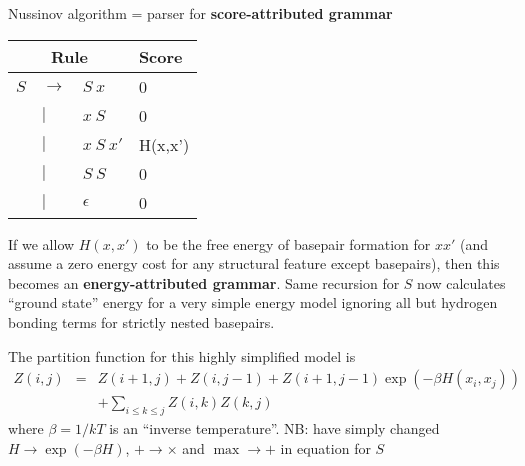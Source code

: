 \documentclass{beamer}
\begin{document}
\begin{frame}{}
Nussinov algorithm = parser for {\bf score-attributed grammar}

\begin{tabular}{rll|l}
\multicolumn{3}{c|}{Rule} & Score \\
\hline
$S$ & $\to$ & $S\ x$     & 0 \\
    &   $|$ & $x\ S$     & 0 \\
    &   $|$ & $x\ S\ x'$ & H(x,x') \\
    &   $|$ & $S\ S$     & 0 \\
    &   $|$ & $\epsilon$ & 0
\end{tabular}

If we allow $H(x,x')$ to be the free energy of basepair formation for $xx'$
(and assume a zero energy cost for any structural feature except basepairs),
then this becomes an {\bf energy-attributed grammar}.
Same recursion for $S$ now calculates ``ground state'' energy
for a very simple energy model ignoring all but hydrogen bonding terms for strictly nested basepairs.
\end{frame}

\begin{frame}{}
The partition function for this highly simplified model is
\begin{eqnarray*}
Z(i,j) & = & Z(i+1,j) + Z(i,j-1) + Z(i+1,j-1) \exp (-\beta H(x_i,x_j)) \\
& & + \sum_{i \leq k \leq j} Z(i,k) Z(k,j)
\end{eqnarray*}
where $\beta = 1/kT$ is an ``inverse temperature''.
NB: have simply changed $H \to \exp(-\beta H)$, $+ \to \times$ and $\max \to +$ in equation for $S$
\end{frame}
\end{document}
